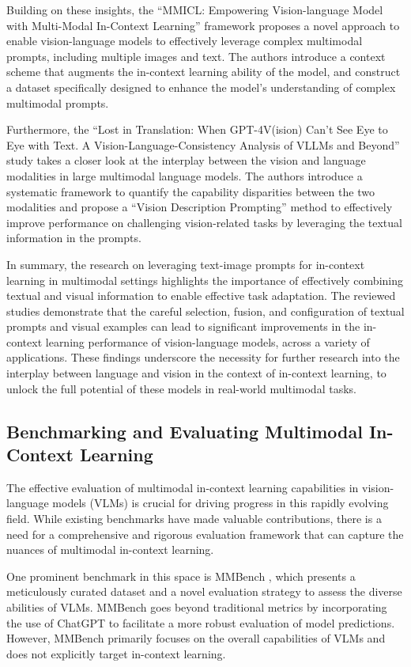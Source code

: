 \documentclass[11pt]{article}
\begin{document}
Building on these insights, the ``MMICL: Empowering Vision-language Model with Multi-Modal In-Context Learning'' \cite{ref58} framework proposes a novel approach to enable vision-language models to effectively leverage complex multimodal prompts, including multiple images and text. The authors introduce a context scheme that augments the in-context learning ability of the model, and construct a dataset specifically designed to enhance the model's understanding of complex multimodal prompts.

Furthermore, the ``Lost in Translation: When GPT-4V(ision) Can't See Eye to Eye with Text. A Vision-Language-Consistency Analysis of VLLMs and Beyond'' \cite{ref59} study takes a closer look at the interplay between the vision and language modalities in large multimodal language models. The authors introduce a systematic framework to quantify the capability disparities between the two modalities and propose a ``Vision Description Prompting'' method to effectively improve performance on challenging vision-related tasks by leveraging the textual information in the prompts.

In summary, the research on leveraging text-image prompts for in-context learning in multimodal settings highlights the importance of effectively combining textual and visual information to enable effective task adaptation. The reviewed studies demonstrate that the careful selection, fusion, and configuration of textual prompts and visual examples can lead to significant improvements in the in-context learning performance of vision-language models, across a variety of applications. These findings underscore the necessity for further research into the interplay between language and vision in the context of in-context learning, to unlock the full potential of these models in real-world multimodal tasks.

\subsection{Benchmarking and Evaluating Multimodal In-Context Learning}

The effective evaluation of multimodal in-context learning capabilities in vision-language models (VLMs) is crucial for driving progress in this rapidly evolving field. While existing benchmarks have made valuable contributions, there is a need for a comprehensive and rigorous evaluation framework that can capture the nuances of multimodal in-context learning.

One prominent benchmark in this space is MMBench \cite{ref60}, which presents a meticulously curated dataset and a novel evaluation strategy to assess the diverse abilities of VLMs. MMBench goes beyond traditional metrics by incorporating the use of ChatGPT to facilitate a more robust evaluation of model predictions. However, MMBench primarily focuses on the overall capabilities of VLMs and does not explicitly target in-context learning.
\end{document}
